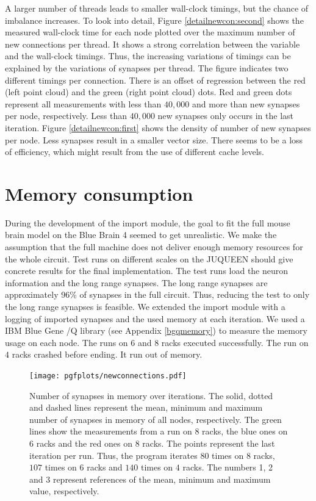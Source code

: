 A larger number of threads leads to smaller wall-clock timings, but the chance of imbalance increases.
To look into detail, Figure \ref{detailnewcon:second} shows the measured wall-clock time for each node
plotted over the maximum number of new connections per thread. It shows a strong correlation between the variable and
the wall-clock timings. Thus, the increasing variations of timings can be explained by the variations of synapses per thread.
The figure indicates two different timings per connection. There is an offset of regression between the red
(left point cloud)
and the green (right point cloud) dots. Red and green dots represent all measurements with less than $40,000$ and more than new synapses per
node, respectively. Less than $40,000$ new synapses only occurs in the last iteration.
Figure \ref{detailnewcon:first} shows the density of number of new synapses per node.
Less synapses result in a smaller vector size. There seems to be a loss of efficiency, which might result from
the use of different cache levels.

\section{Memory consumption}
During the development of the import module, the goal to fit the full mouse brain model on the
Blue Brain 4 seemed to get unrealistic. We make the assumption that the full machine does not deliver enough memory resources for the whole circuit.
Test runs on different scales on the JUQUEEN should give concrete results for the final implementation.
The test runs load the neuron information and the long range synapses.
The long range synapses are approximately 96\% of synapses in the full circuit.
Thus, reducing the test to only the long range synapses is feasible.
We extended the import module with a logging of imported synapses and the used memory at each iteration.
We used a IBM Blue Gene /Q library (see Appendix \ref{bgqmemory}) to measure the memory usage on each node.
The runs on $6$ and $8$ racks executed successfully.
The run on $4$ racks crashed before ending.
It run out of memory.

\newpage
\begin{figure}[h!]
\begin{center}
 \texttt{[image: pgfplots/newconnections.pdf]}
\end{center}
\caption[Number of synapses in memory over iterations]{Number of synapses in memory over iterations.
The solid, dotted and dashed lines represent the mean, minimum and maximum number of synapses in memory of all nodes, respectively.
The green lines show the measurements from a run on 8 racks, the blue ones on 6 racks and the red ones on 8 racks.
The points represent the last iteration per run.
Thus, the program iterates $80$ times on $8$ racks, $107$ times on $6$ racks and $140$ times on $4$ racks.
The numbers 1, 2 and 3 represent references of the mean, minimum and maximum value, respectively.
 }
\label{fig:newconnections}
\end{figure}

